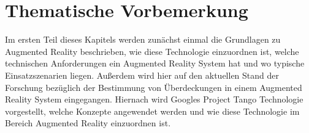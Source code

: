 \chapter{Thematische Vorbemerkung} \label{sec:thema}

Im ersten Teil dieses Kapitels werden zunächst einmal die Grundlagen zu Augmented Reality beschrieben, wie diese Technologie einzuordnen ist, welche technischen Anforderungen ein Augmented Reality System hat und wo typische Einsatzszenarien liegen. Außerdem wird hier auf den aktuellen Stand der Forschung bezüglich der Bestimmung von Überdeckungen in einem Augmented Reality System eingegangen. Hiernach wird Googles Project Tango Technologie vorgestellt, welche Konzepte angewendet werden und wie diese Technologie im Bereich Augmented Reality einzuordnen ist. 






